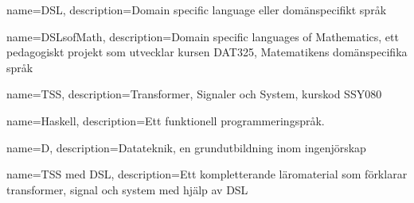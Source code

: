 {
    name=DSL,
    description={Domain specific language eller domänspecifikt språk}
}

{
    name=DSLsofMath,
    description={Domain specific languages of Mathematics, ett pedagogiskt projekt som utvecklar kursen DAT325, Matematikens domänspecifika språk}
}


{
    name=TSS,
    description={Transformer, Signaler och System, kurskod SSY080}
}

{
	name=Haskell,
	description={Ett funktionell programmeringspråk.}
}

{
    name=D,
    description={Datateknik, en grundutbildning inom ingenjörskap}
}

{
    name={TSS med DSL},
    description={Ett kompletterande läromaterial som förklarar transformer, signal och system med hjälp av DSL}
}